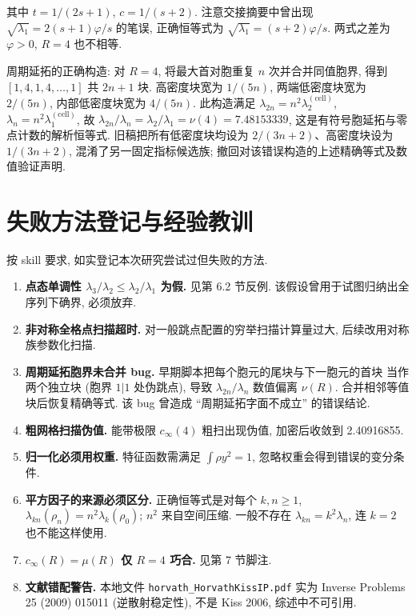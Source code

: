 \documentclass[UTF8]{ctexart}
\begin{document}
其中 $t = 1/(2s+1)$, $c = 1/(s+2)$. 注意交接摘要中曾出现
$\sqrt{\lambda_1} = 2(s+1)\varphi/s$ 的笔误, 正确恒等式为 $\sqrt{\lambda_1} = (s+2)\varphi/s$.
两式之差为 $\varphi>0$, $R=4$ 也不相等.

周期延拓的正确构造: 对 $R=4$, 将最大首对胞重复 $n$ 次并合并同值胞界,
得到 $[1,4,1,4,\dots,1]$ 共 $2n+1$ 块.
高密度块宽为 $1/(5n)$, 两端低密度块宽为 $2/(5n)$,
内部低密度块宽为 $4/(5n)$. 此构造满足
$\lambda_{2n} = n^2 \lambda_2^{(\text{cell})}$, $\lambda_n = n^2 \lambda_1^{(\text{cell})}$,
故 $\lambda_{2n}/\lambda_n = \lambda_2/\lambda_1 = \nu(4) = 7.48153339$,
这是有符号胞延拓与零点计数的解析恒等式.
旧稿把所有低密度块均设为 $2/(3n+2)$、高密度块设为 $1/(3n+2)$,
混淆了另一固定指标候选族; 撤回对该错误构造的上述精确等式及数值验证声明.

\section{失败方法登记与经验教训}

按 skill 要求, 如实登记本次研究尝试过但失败的方法.

\begin{enumerate}
	\item \textbf{点态单调性 $\lambda_3/\lambda_2 \leq \lambda_2/\lambda_1$ 为假.}
		见第 6.2 节反例. 该假设曾用于试图归纳出全序列下确界, 必须放弃.
	\item \textbf{非对称全格点扫描超时.} 对一般跳点配置的穷举扫描计算量过大,
		后续改用对称族参数化扫描.
	\item \textbf{周期延拓胞界未合并 bug.} 早期脚本把每个胞元的尾块与下一胞元的首块
		当作两个独立块 (胞界 $1|1$ 处伪跳点), 导致 $\lambda_{2n}/\lambda_n$ 数值偏离 $\nu(R)$.
		合并相邻等值块后恢复精确等式. 该 bug 曾造成 ``周期延拓字面不成立'' 的错误结论.
	\item \textbf{粗网格扫描伪值.} 能带极限 $c_{\infty}(4)$ 粗扫出现伪值,
		加密后收敛到 2.40916855.
	\item \textbf{归一化必须用权重.} 特征函数需满足 $\int \rho y^2 = 1$,
		忽略权重会得到错误的变分条件.
	\item \textbf{平方因子的来源必须区分.} 正确恒等式是对每个 $k,n\ge1$,
		$\lambda_{kn}(\rho_n)=n^2\lambda_k(\rho_0)$; $n^2$ 来自空间压缩.
		一般不存在 $\lambda_{kn}=k^2\lambda_n$, 连 $k=2$ 也不能这样使用.
	\item \textbf{$c_{\infty}(R) = \mu(R)$ 仅 $R = 4$ 巧合.} 见第 7 节脚注.
	\item \textbf{文献错配警告.} 本地文件 \texttt{horvath\_HorvathKissIP.pdf} 实为
		Inverse Problems 25 (2009) 015011 (逆散射稳定性), 不是 Kiss 2006, 综述中不可引用.
\end{enumerate}
\end{document}
